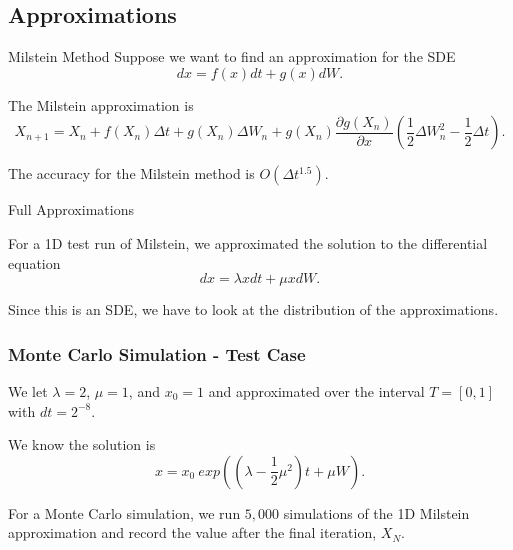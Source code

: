 \subsection{Approximations}

\begin{frame}{Milstein Method}
Suppose we want to find an approximation for the SDE $$dx = f(x) dt + g(x) dW.$$
	
	\vfill
	
	The Milstein approximation is 
		$$X_{n+1} = X_n + f(X_n)\Delta t + g(X_n) \Delta W_n + g(X_n) \frac{\partial g(X_n)}{\partial x}  \left(\frac{1}{2} \Delta W_n ^2 - \frac{1}{2} \Delta t \right).$$
	
	\vfill


	The accuracy for the Milstein method is $O(\Delta t^{1.5}).$

\end{frame}

\begin{frame}{Full Approximations}

\vfill

For a 1D test run of Milstein, we approximated the solution to the differential equation $$dx = \lambda x dt + \mu x dW.$$

\vfill

Since this is an SDE, we have to look at the distribution of the approximations.

\vfill

\end{frame}


\begin{frame}
   \frametitle{Monte Carlo Simulation - Test Case}
We let $\lambda = 2$, $\mu = 1$, and $x_0 = 1$ and approximated over the interval $T=[0,1]$ with $dt = 2^{-8}$. 

\vfill

We know the solution is $$x=x_0 \ exp\left((\lambda - \frac{1}{2}\mu^2)t + \mu W\right).$$

\vspace{2em}

For a Monte Carlo simulation, we run $5,000$ simulations of the 1D Milstein approximation and record the value after the final iteration, $X_N$. 

\end{frame}

